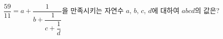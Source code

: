 $\dfrac{59}{11}=a+\dfrac{1}{b+\dfrac{1}{c+\dfrac{1}{d}}}$을 만족시키는 자연수 $a$, $b$, $c$, $d$에 대하여 $abcd$의 값은?
